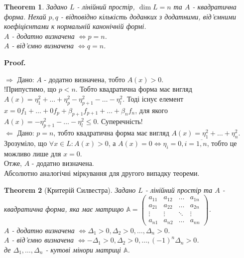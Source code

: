 \documentclass[a4paper, 10pt]{article}
\makeatletter
\def\rightproof{$\boxed{\Rightarrow}$ }
\def\leftproof{$\boxed{\Leftarrow}$ }
\theoremstyle{theoremdd}
\newtheorem{theorem}{Theorem}[subsection]
\renewenvironment{proof}[1][Proof.\\]{\par
\pushQED{\hfill \qed}%
\normalfont \topsep6\p@\@plus6\p@\relax
\trivlist
\item\relax
{\bfseries
#1\@addpunct{.}}\hspace\labelsep\ignorespaces
}{%
\popQED\endtrivlist\@endpefalse
}
\makeatother
\begin{document}
\begin{theorem}
Задано $L$ - лінійний простір, $\dim L = n$ та $A$ - квадратична форма. Нехай $p,q$ - відповідно кількість доданких з додатними, від'ємними коефіцієнтами к нормальній канонічній формі.\\
$A$ - додатно визначена $\iff p = n$.\\
$A$ - від'ємно визначена $\iff q = n$.
\end{theorem}

\begin{proof}
\rightproof Дано: $A$ - додатно визначена, тобто $A(x) > 0$.\\
!Припустимо, що $p < n$. Тобто квадратична форма має вигляд $A(x) = \eta_1^2 + \dots + \eta_p^2 - \eta_{p+1}^2 - \dots - \eta_l^2$. Тоді існує елемент $x = 0f_1 + \dots + 0f_p + \beta_{p+1}f_{p+1} + \dots + \beta_n f_n$, для якого $A(x) = -\eta_{p+1}^2 - \dots - \eta_l^2 \leq 0$. Суперечність!
\bigskip \\
\leftproof Дано: $p = n$, тобто квадратична форма має вигляд $A(x) = \eta_1^2 + \dots + \eta_n^2$. Зрозуміло, що $\forall x \in L: A(x) > 0$, а $A(x) = 0 \iff \eta_i = 0, i = \overline{1,n}$, тобто це можливо лише для $x = 0$. \\
Отже, $A$ - додатно визначена.
\bigskip \\
Абсолютно аналогічні міркування для другого випадку теореми.
\end{proof}

\begin{theorem}[Критерій Силвестра]
Задано $L$ - лінійний простір та $A$ - квадратична форма, яка має матрицю $\mathbb{A} = \begin{pmatrix}
a_{11} & a_{12} & \dots & a_{1n} \\
a_{21} & a_{22} & \dots & a_{2n} \\
\vdots & \vdots & \ddots & \vdots \\
a_{n1} & a_{n2} & \dots & a_{nn}
\end{pmatrix}$.\\
$A$ - додатно визначена $\iff \Delta_1 > 0, \Delta_2 > 0, \dots, \Delta_n > 0$.\\
$A$ - від'ємно визначена $\iff -\Delta_1 > 0, \Delta_2 > 0, \dots, (-1)^n\Delta_n > 0$.\\
де $\Delta_1,\dots,\Delta_n$ - кутові мінори матриці $\mathbb{A}$.
\end{theorem}
\end{document}
